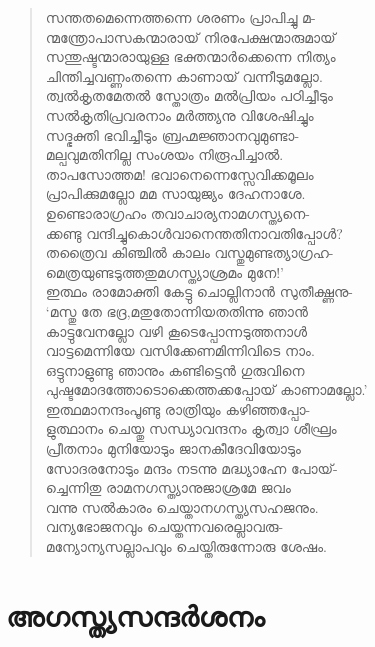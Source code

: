 \begin{verse}
സന്തതമെന്നെത്തന്നെ ശരണം പ്രാപിച്ചു മ-\\
ന്മന്ത്രോപാസകന്മാരായ് നിരപേക്ഷന്മാരുമായ്\\
സന്തുഷ്ടന്മാരായുള്ള ഭക്തന്മാര്‍ക്കെന്നെ നിത്യം\\
ചിന്തിച്ചവണ്ണംതന്നെ കാണായ് വന്നീടുമല്ലോ.\\
ത്വല്‍കൃതമേതല്‍ സ്തോത്രം മല്‍പ്രിയം പഠിച്ചീടും\\
സല്‍കൃതിപ്രവരനാം മര്‍ത്ത്യനു വിശേഷിച്ചും\\
സദ്ഭക്തി ഭവിച്ചീടും ബ്രഹ്മജ്ഞാനവുമുണ്ടാ-\\
മല്പവുമതിനില്ല സംശയം നിരൂപിച്ചാല്‍.\\
താപസോത്തമ! ഭവാനെന്നെസ്സേവിക്കമൂലം\\
പ്രാപിക്കുമല്ലോ മമ സായുജ്യം ദേഹനാശേ.\\
ഉണ്ടൊരാഗ്രഹം തവാചാര്യനാമഗസ്ത്യനെ-\\
ക്കണ്ടു വന്ദിച്ചുകൊള്‍വാനെന്തതിനാവതിപ്പോള്‍?\\
തത്രൈവ കിഞ്ചില്‍ കാലം വസ്തുമുണ്ടത്യാഗ്രഹ-\\
മെത്രയുണ്ടടുത്തതുമഗസ്ത്യാശ്രമം മുനേ!’\\
ഇത്ഥം രാമോക്തി കേട്ടു ചൊല്ലിനാന്‍ സുതീക്ഷ്ണനു-\\
‘മസ്തു തേ ഭദ്ര,മതുതോന്നിയതതിന്നു ഞാന്‍\\
കാട്ടുവേനല്ലോ വഴി കൂടെപ്പോന്നടുത്തനാള്‍\\
വാട്ടമെന്നിയേ വസിക്കേണമിന്നിവിടെ നാം.\\
ഒട്ടുനാളുണ്ടു ഞാനും കണ്ടിട്ടെന്‍ ഗുരുവിനെ\\
പുഷ്ടമോദത്തോടൊക്കെത്തക്കപ്പോയ് കാണാമല്ലോ.’\\
ഇത്ഥമാനന്ദംപൂണ്ടു രാത്രിയും കഴിഞ്ഞപ്പോ-\\
ളുത്ഥാനം ചെയ്തു സന്ധ്യാവന്ദനം കൃത്വാ ശീഘ്രം\\
പ്രീതനാം മുനിയോടും ജാനകീദേവിയോടും\\
സോദരനോടും മന്ദം നടന്നു മദ്ധ്യാഹ്നേ പോയ്-\\
ച്ചെന്നിതു രാമനഗസ്ത്യാനുജാശ്രമേ ജവം\\
വന്നു സല്‍കാരം ചെയ്താനഗസ്ത്യസഹജനും.\\
വന്യഭോജനവും ചെയ്തന്നവരെല്ലാവരു-\\
മന്യോന്യസല്ലാപവും ചെയ്തിരുന്നോരു ശേഷം.
\end{verse}

\section{അഗസ്ത്യസന്ദര്‍ശനം}

